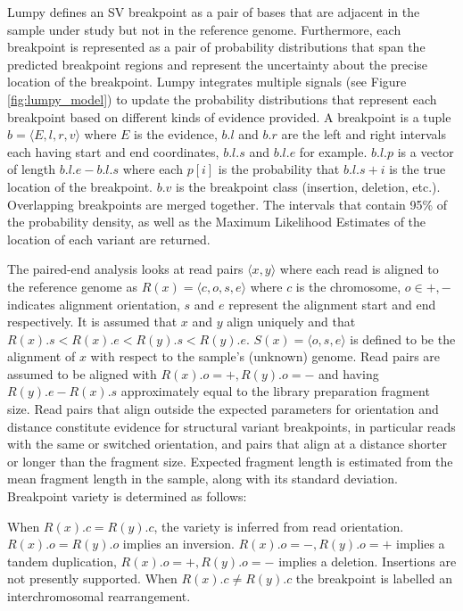 Lumpy defines an SV breakpoint as a pair of bases that are adjacent in the sample under study but not in the reference genome. Furthermore, each breakpoint is represented as a pair of probability distributions that span the predicted breakpoint regions and represent the uncertainty about the precise location of the breakpoint. Lumpy integrates multiple signals (see Figure \ref{fig:lumpy_model}) to update the probability distributions that represent each breakpoint based on different kinds of evidence provided. A breakpoint is a tuple $b = \langle E,l,r,v \rangle$ where $E$ is the evidence, $b.l$ and $b.r$ are the left and right intervals each having start and end coordinates, $b.l.s$ and $b.l.e$ for example. $b.l.p$ is a vector of length $b.l.e - b.l.s$ where each $p[i]$ is the probability that $b.l.s + i$ is the true location of the breakpoint. $b.v$ is the breakpoint class (insertion, deletion, etc.). Overlapping breakpoints are merged together. The intervals that contain 95\% of the probability density, as well as the Maximum Likelihood Estimates of the location of each variant are returned. 

The paired-end analysis looks at read pairs $\langle x, y\rangle$ where each read is aligned to the reference genome as $R(x) = \langle c, o, s, e \rangle$ where $c$ is the chromosome, $o \in {+,-}$ indicates alignment orientation, $s$ and $e$ represent the alignment start and end respectively. It is assumed that $x$ and $y$ align uniquely and that $R(x).s < R(x).e < R(y).s < R(y).e$. $S(x) = \langle o, s, e \rangle$ is defined to be the alignment of $x$ with respect to the sample's (unknown) genome. Read pairs are assumed to be aligned with $R(x).o = +, R(y).o = -$ and having $R(y).e - R(x).s$ approximately equal to the library preparation fragment size. Read pairs that align outside the expected parameters for orientation and distance constitute evidence for structural variant breakpoints, in particular reads with the same or switched orientation, and pairs that align at a distance shorter or longer than the fragment size. Expected fragment length is estimated from the mean fragment length in the sample, along with its standard deviation. Breakpoint variety is determined as follows:

When $R(x).c = R(y).c$, the variety is inferred from read orientation. $R(x).o = R(y).o$ implies an inversion. $R(x).o = -, R(y).o = +$ implies a tandem duplication, $R(x).o = +, R(y).o = -$ implies a deletion. Insertions are not presently supported. When $R(x).c \ne R(y).c$ the breakpoint is labelled an interchromosomal rearrangement.


